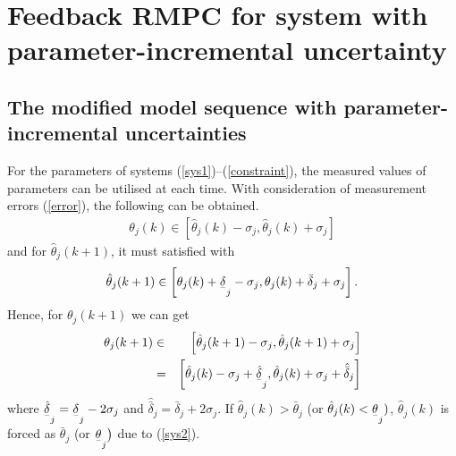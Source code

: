 \documentclass{singlecol-new}
\theoremstyle{TH}{
\newtheorem{lemma}{Lemma}
\newtheorem{theorem}[lemma]{Theorem}
\newtheorem{corrolary}[lemma]{Corrolary}
\newtheorem{conjecture}[lemma]{Conjecture}
\newtheorem{proposition}[lemma]{Proposition}
\newtheorem{claim}[lemma]{Claim}
\newtheorem{stheorem}[lemma]{Wrong Theorem}
\newtheorem{algorithm}{Algorithm}
}
\theoremstyle{THrm}{
\newtheorem{definition}{Definition}[section]
\newtheorem{question}{Question}[section]
\newtheorem{remark}{Remark}
\newtheorem{scheme}{Scheme}
}
\theoremstyle{THhit}{
\newtheorem{case}{Case}[section]
}
\begin{document}
\section{Feedback RMPC for system with parameter-incremental uncertainty}

\subsection{The modified model sequence with parameter-incremental uncertainties}

For the parameters of systems (\ref{sys1})--(\ref{constraint}), the
measured values of parameters can be utilised at each time. With
consideration of measurement errors (\ref{error}), the following can
be obtained.
\begin{eqnarray*}
\theta _j (k) \in \left[ {\hat \theta _j (k) - \sigma _j ,\hat
\theta _j (k) + \sigma _j } \right]
\end{eqnarray*}
\noindent and for $\hat \theta _j (k + 1)$, it must satisfied with
\begin{eqnarray*}
\hat \theta _j (k + 1) \in \left[ {\theta _j (k) +
\underset{\raise0.3em\hbox{$\smash{\scriptscriptstyle-}$}}{\delta}_j
 - \sigma _j ,\theta _j (k) + \bar \delta _j  + \sigma _j }\right].
\end{eqnarray*}
\noindent Hence, for $\theta _j (k + 1)$ we can get
\begin{eqnarray*}
\theta _j (k + 1) &\in& \left[ {\hat \theta _j (k + 1) - \sigma _j,
\hat \theta _j (k + 1) + \sigma _j } \right] \\
&=& \left[ \hat\theta _j (k) -\sigma_j+
\underset{\raise0.3em\hbox{$\smash{\scriptscriptstyle-}$}}{\hat\delta}
_j,
 \hat\theta _j (k) + \sigma_j+ \hat{\bar{ \delta}} _j\right]
\end{eqnarray*}
where
${\underset{\raise0.3em\hbox{$\smash{\scriptscriptstyle-}$}}{\hat\delta
}_j}={\underset{\raise0.3em\hbox{$\smash{\scriptscriptstyle-}$}}{\delta
} _j -2\sigma_j}$ and $ \hat{\bar {\delta}} _j={\bar {\delta}}_j
+2\sigma_j$. If $\hat\theta_j(k)>\bar {\theta} _j$ (or
$\hat\theta_j(k)<\underset{\raise0.3em\hbox{$\smash{\scriptscriptstyle-}$}}{\theta
} _j )$, $\hat\theta_j(k)$ is forced as $\bar {\theta} _j$ \big(or
$\underset{\raise0.3em\hbox{$\smash{\scriptscriptstyle-}$}}{\theta}_j\big)$
due to (\ref{sys2}).
\end{document}
